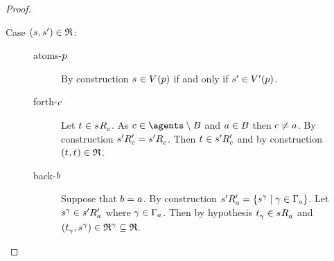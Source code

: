 \begin{proof}
\begin{description}
    \item[Case $(\kStateS, \kStateSP) \in \refinement$:]
        \hfill
        \begin{description}
            \item[atoms-$\atomP$] 
                By construction $\kStateS \in \kValuation(\atomP)$ if and only if $\kStateSP \in \kValuationP(\atomP)$.
            \item[forth-$\agentC$]
                Let $\kStateT \in \kSuccessorsC{\kStateS}$.
                As $\agentC \in \agents \setminus \agentsB$ and $\agentA \in \agentsB$ then $\agentC \neq \agentA$.
                By construction $\kSuccessorsPC{\kStateSP} = \kSuccessorsC{\kStateSP}$.
                Then $\kStateT \in \kSuccessorsPC{\kStateSP}$ and by construction $(\kStateT, \kStateT) \in \refinement$.
            \item[back-$\agentB$]
                Suppose that $\agentB = \agentA$.
                By construction $\kSuccessorsPA{\kStateSP} = \{\kStateS[\gamma] \mid \gamma \in \Gamma_\agentA\}$.
                Let $\kStateS[\gamma] \in \kSuccessorsPA{\kStateSP}$ where $\gamma \in \Gamma_\agentA$.
                Then by hypothesis $\kStateT_\gamma \in \kSuccessorsA{\kStateS}$ and $(\kStateT_\gamma, \kStateS[\gamma]) \in \refinement^\gamma \subseteq \refinement$.


\end{description}
\end{description}
\end{proof}
